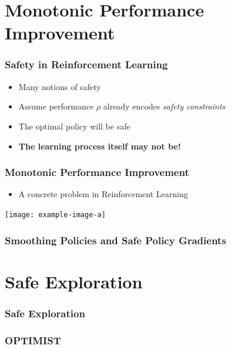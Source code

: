 \documentclass{beamer}
\begin{document}
\section{Monotonic Performance Improvement}
\addtocounter{framenumber}{-1}
\frame{\tableofcontents[currentsection]}
\begin{frame}
\frametitle{Safety in Reinforcement Learning}
\begin{itemize}
	\setlength{\itemsep}{10pt}
	\item Many notions of safety ~\citep{amodei2016concrete,garcia2015comprehensive}
	\item Assume performance $\rho$ already encodes \emph{safety constraints}
	\item The optimal policy will be safe
	\item \textbf{The learning process itself may not be!}
\end{itemize}
\end{frame}

\begin{frame}
\frametitle{Monotonic Performance Improvement}
\begin{itemize}
	\item A concrete problem in Reinforcement Learning
\end{itemize}
\vfill
\centering
\texttt{[image: example-image-a]}
\end{frame}

\begin{frame}
\frametitle{Smoothing Policies and Safe Policy Gradients}
\end{frame}

\section{Safe Exploration}
\addtocounter{framenumber}{-1}
\frame{\tableofcontents[currentsection]}

\begin{frame}
\frametitle{Safe Exploration}
\end{frame}


\begin{frame}
\frametitle{OPTIMIST}
\end{frame}
\end{document}

